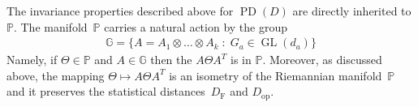 \documentclass[aos]{imsart}
\theoremstyle{definition}
\numberwithin{equation}{section}
\DeclareMathOperator{\GL}{GL}
\DeclareMathOperator{\PD}{PD}
\DeclarePairedDelimiter{\norm}{\lVert}{\rVert}
\newcommand{\R}{{\mathbb{R}}}
\renewcommand{\P}{{\mathbb{P}}}
\renewcommand{\H}{{\mathbb{H}}}
\newcommand{\G}{{\mathbb{G}}}
\newcommand{\ot}{\otimes}
\newcommand{\samp}{x}
\newcommand{\rv}{x}
\newcommand{\DF}{D_{\operatorname{F}}}
\newcommand{\Dop}{D_{\operatorname{op}}}
\newcommand{\CF}[1]{{\color{purple}[CF: #1]}}
\newcommand{\MW}[1]{{\color{red}[MW: #1]}}
\newcommand{\CF}[1]{{}}
\newcommand{\MW}[1]{{}}
\begin{document}


The invariance properties described above for $\PD(D)$ are directly inherited to $\P$.
The manifold~$\P$ carries a natural action by the group
\begin{align*}
  \G =  \{ A = A_1 \ot \dots \ot A_k \;:\; G_a \in \GL(d_a) \}
\end{align*}
Namely, if $\Theta \in \P$ and $A \in \G$ then the $A \Theta A^T$ is in $\P$.
Moreover, as discussed above, the mapping $\Theta \mapsto A\Theta A^T$ is an isometry of the Riemannian manifold~$\P$ and it preserves the statistical distances~$\DF$ and $\Dop$.


\end{document}

